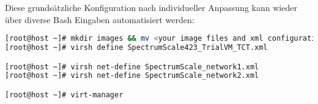 Diese grundsätzliche Konfiguration nach individueller Anpassung kann wieder über diverse Bash Eingaben automatisiert werden: \\

\begin{lstlisting}[language=bash, caption=Portierung des VM Abbilds]
[root@host ~]# mkdir images && mv <your image files and xml configuration> images
[root@host ~]# virsh define SpectrumScale423_TrialVM_TCT.xml 

[root@host ~]# virsh net-define SpectrumScale_network1.xml
[root@host ~]# virsh net-define SpectrumScale_network2.xml

[root@host ~]# virt-manager
\end{lstlisting}



